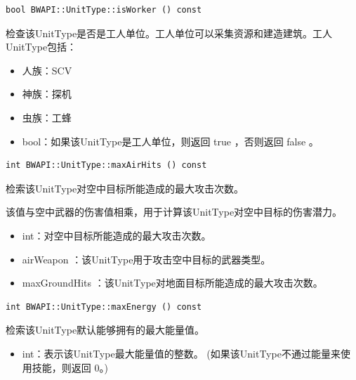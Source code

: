 \begin{tcolorbox}[colback=white, colframe=black!60!white, title=isWorker(), arc=0mm]
    \begin{verbatim}
bool BWAPI::UnitType::isWorker () const
    \end{verbatim}
    检查该UnitType是否是工人单位。工人单位可以采集资源和建造建筑。工人UnitType包括：
    \begin{itemize}
        \item 人族：SCV
        \item 神族：探机
        \item 虫族：工蜂
    \end{itemize}
    \begin{return}
        \begin{itemize}
            \item bool：如果该UnitType是工人单位，则返回   true  ，否则返回   false  。
        \end{itemize}
    \end{return}
\end{tcolorbox}


\begin{tcolorbox}[colback=white, colframe=black!60!white, title=maxAirHits(), arc=0mm]
    \begin{verbatim}
int BWAPI::UnitType::maxAirHits () const
    \end{verbatim}
    检索该UnitType对空中目标所能造成的最大攻击次数。\par 该值与空中武器的伤害值相乘，用于计算该UnitType对空中目标的伤害潜力。
    \begin{return}
        \begin{itemize}
            \item int：对空中目标所能造成的最大攻击次数。
        \end{itemize}
    \end{return}
    \begin{refer}
        \begin{itemize}
            \item airWeapon  ：该UnitType用于攻击空中目标的武器类型。
            \item maxGroundHits  ：该UnitType对地面目标所能造成的最大攻击次数。
        \end{itemize}
    \end{refer}
\end{tcolorbox}


\begin{tcolorbox}[colback=white, colframe=black!60!white, title=maxEnergy(), arc=0mm]
    \begin{verbatim}
int BWAPI::UnitType::maxEnergy () const
    \end{verbatim}
    检索该UnitType默认能够拥有的最大能量值。
    \begin{return}
        \begin{itemize}
            \item int：表示该UnitType最大能量值的整数。
            (如果该UnitType不通过能量来使用技能，则返回 0。)
        \end{itemize}
    \end{return}
\end{tcolorbox}


